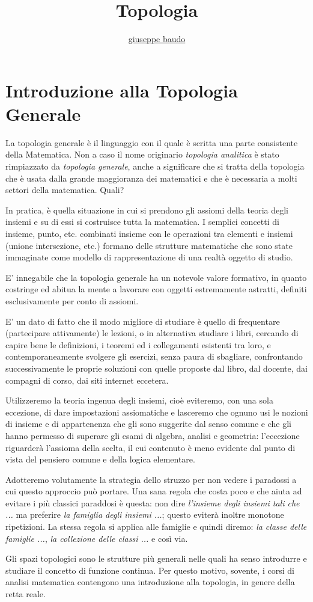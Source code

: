 \documentclass[a4paper,10pt]{article}
\title{Topologia}
\author{\href{http://www.baudo.hol.es}{giuseppe baudo}}
\begin{document}
\maketitle

\section{Introduzione alla Topologia Generale}
La topologia generale è il linguaggio con il quale è scritta una parte consistente della Matematica. Non a caso il nome originario \textit{topologia analitica} è stato
rimpiazzato da \textit{topologia generale}, anche a significare che si tratta della topologia che è usata dalla grande maggioranza dei matematici e che è necessaria a molti
settori della matematica. Quali?

In pratica, è quella situazione in cui si prendono gli assiomi della teoria degli insiemi e su di essi si costruisce tutta la matematica. I semplici concetti di insieme, punto, etc.
combinati insieme con le operazioni tra elementi e insiemi (unione intersezione, etc.) formano delle strutture matematiche che sono state immaginate come modello di rappresentazione
di una realtà oggetto di studio.

E' innegabile che la topologia generale ha un notevole valore formativo, in quanto costringe ed abitua la mente a lavorare con oggetti estremamente astratti, definiti 
esclusivamente per conto di assiomi. 

E' un dato di fatto che il modo migliore di studiare è quello di frequentare (partecipare attivamente) le lezioni, o in alternativa studiare i libri, cercando di capire bene
le definizioni, i teoremi ed i collegamenti esistenti tra loro, e contemporaneamente svolgere gli esercizi, senza paura di sbagliare, confrontando successivamente le proprie
soluzioni con quelle proposte dal libro, dal docente, dai compagni di corso, dai siti internet eccetera. 

Utilizzeremo la teoria ingenua degli insiemi, cioè eviteremo, con una sola eccezione, di dare impostazioni assiomatiche e lasceremo che ognuno usi le nozioni di insieme
e di appartenenza che gli sono suggerite dal senso comune e che gli hanno permesso di superare gli esami di algebra, analisi e geometria: l'eccezione riguarderà l'assioma
della scelta, il cui contenuto è meno evidente dal punto di vista del pensiero comune e della logica elementare.

Adotteremo volutamente la strategia dello struzzo per non vedere i paradossi a cui questo approccio può portare. Una sana regola che costa poco e che aiuta ad evitare
i più classici paraddosi è questa: non dire \textit{l'insieme degli insiemi tali che ...} ma preferire \textit{la famiglia degli insiemi ...}; questo eviterà inoltre
monotone ripetizioni. La stessa regola si applica alle famiglie e quindi diremo: \textit{la classe delle famiglie ...}, \textit{la collezione delle classi ...} e così via.

Gli spazi topologici sono le strutture più generali nelle quali ha senso introdurre e studiare il concetto di funzione continua. Per questo motivo, sovente, i corsi di analisi
matematica contengono una introduzione alla topologia, in genere della retta reale.
\end{document}
